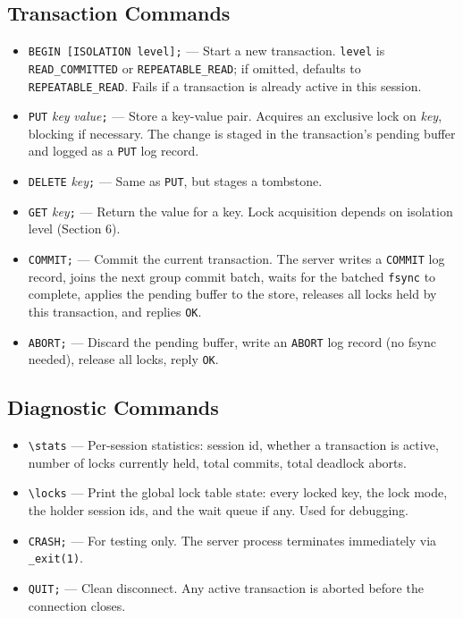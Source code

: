 \documentclass[11pt,a4paper]{article}
\begin{document}
\subsection{Transaction Commands}
\begin{itemize}
\item \texttt{BEGIN [ISOLATION level];} --- Start a new transaction. \texttt{level} is \texttt{READ\_COMMITTED} or \texttt{REPEATABLE\_READ}; if omitted, defaults to \texttt{REPEATABLE\_READ}. Fails if a transaction is already active in this session.

\item \texttt{PUT} \textit{key} \textit{value}\texttt{;} --- Store a key-value pair. Acquires an exclusive lock on \textit{key}, blocking if necessary. The change is staged in the transaction's pending buffer and logged as a \texttt{PUT} log record.

\item \texttt{DELETE} \textit{key}\texttt{;} --- Same as \texttt{PUT}, but stages a tombstone.

\item \texttt{GET} \textit{key}\texttt{;} --- Return the value for a key. Lock acquisition depends on isolation level (Section 6).

\item \texttt{COMMIT;} --- Commit the current transaction. The server writes a \texttt{COMMIT} log record, joins the next group commit batch, waits for the batched \texttt{fsync} to complete, applies the pending buffer to the store, releases all locks held by this transaction, and replies \texttt{OK}.

\item \texttt{ABORT;} --- Discard the pending buffer, write an \texttt{ABORT} log record (no fsync needed), release all locks, reply \texttt{OK}.
\end{itemize}

\subsection{Diagnostic Commands}
\begin{itemize}
\item \verb|\stats| --- Per-session statistics: session id, whether a transaction is active, number of locks currently held, total commits, total deadlock aborts.

\item \verb|\locks| --- Print the global lock table state: every locked key, the lock mode, the holder session ids, and the wait queue if any. Used for debugging.

\item \texttt{CRASH;} --- For testing only. The server process terminates immediately via \texttt{\_exit(1)}.

\item \texttt{QUIT;} --- Clean disconnect. Any active transaction is aborted before the connection closes.
\end{itemize}
\end{document}
